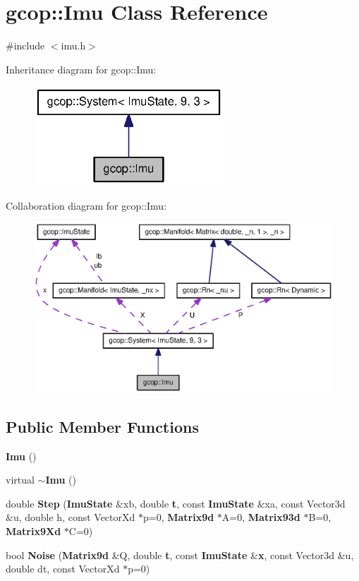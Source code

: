 \section{gcop\-:\-:\-Imu \-Class \-Reference}
\label{classgcop_1_1Imu}


{\ttfamily \#include $<$imu.\-h$>$}



\-Inheritance diagram for gcop\-:\-:\-Imu\-:
\nopagebreak
\begin{figure}[H]
\begin{center}
\leavevmode
\includegraphics[width=202pt]{classgcop_1_1Imu__inherit__graph}
\end{center}
\end{figure}


\-Collaboration diagram for gcop\-:\-:\-Imu\-:
\nopagebreak
\begin{figure}[H]
\begin{center}
\leavevmode
\includegraphics[width=350pt]{classgcop_1_1Imu__coll__graph}
\end{center}
\end{figure}
\subsection*{\-Public \-Member \-Functions}
\begin{DoxyCompactItemize}
\item 
{\bf \-Imu} ()
\item 
virtual {\bf $\sim$\-Imu} ()
\item 
double {\bf \-Step} ({\bf \-Imu\-State} \&xb, double {\bf t}, const {\bf \-Imu\-State} \&xa, const \-Vector3d \&u, double h, const \-Vector\-Xd $\ast$p=0, {\bf \-Matrix9d} $\ast$\-A=0, {\bf \-Matrix93d} $\ast$\-B=0, {\bf \-Matrix9\-Xd} $\ast$\-C=0)
\item 
bool {\bf \-Noise} ({\bf \-Matrix9d} \&\-Q, double {\bf t}, const {\bf \-Imu\-State} \&{\bf x}, const \-Vector3d \&u, double dt, const \-Vector\-Xd $\ast$p=0)
\end{DoxyCompactItemize}

